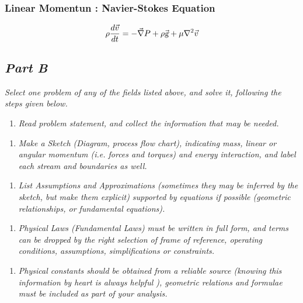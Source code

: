 \documentclass{article}
\begin{document}
\subsubsection*{Linear Momentun : Navier-Stokes Equation}

\begin{equation}
\rho \frac{d \vec{v}}{d t} = - \vec{\nabla} P + \rho \vec{\textsl{g}} + \mu \nabla^2 \vec{v}
\end{equation}

\subsection*{\emph{Part B}}
\textit{Select one problem of any of the fields listed above, and solve it, following the steps given below.}

\begin{enumerate}
\item \textit{Read problem statement, and collect the information that may be needed.}
\end{enumerate}



\begin{enumerate}[resume]
\item \textit{Make a Sketch (Diagram, process flow chart), indicating mass, linear or angular momentum (i.e. forces and torques) and energy interaction, and label each stream and boundaries as well.}
\end{enumerate}



\begin{enumerate}[resume]
\item \textit{List Assumptions and Approximations (sometimes they may be inferred by the sketch, but make them explicit) supported by equations if possible (geometric relationships, or fundamental equations).}
\end{enumerate}



\begin{enumerate}[resume]
\item \textit{Physical Laws (Fundamental Laws) must be written in full form, and terms can be dropped by the right selection of frame of reference, operating conditions, assumptions, simplifications or constraints.}
\end{enumerate}



\begin{enumerate}[resume]
\item \textit{Physical constants should be obtained from a reliable source (knowing this information by heart is always helpful ), geometric relations and formulae must be included as part of your analysis.}
\end{enumerate}
\end{document}
